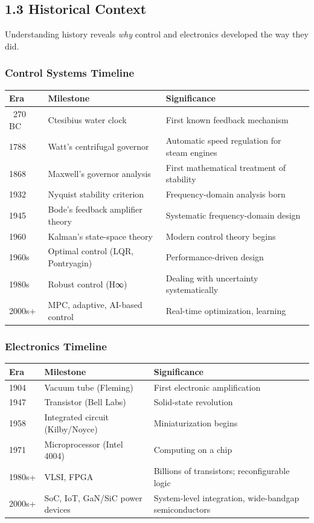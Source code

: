 \documentclass[11pt,a4paper]{book}
\begin{document}
\medskip\noindent\hrulefill\medskip

\subsection{1.3 Historical Context}

Understanding history reveals \textit{why} control and electronics developed the way they did.

\subsubsection{Control Systems Timeline}

\begin{center}
\begin{tabular}{|l|l|l|}
\hline
Era & Milestone & Significance \\
\hline
~270 BC & Ctesibius water clock & First known feedback mechanism \\
1788 & Watt's centrifugal governor & Automatic speed regulation for steam engines \\
1868 & Maxwell's governor analysis & First mathematical treatment of stability \\
1932 & Nyquist stability criterion & Frequency-domain analysis born \\
1945 & Bode's feedback amplifier theory & Systematic frequency-domain design \\
1960 & Kalman's state-space theory & Modern control theory begins \\
1960s & Optimal control (LQR, Pontryagin) & Performance-driven design \\
1980s & Robust control (H∞) & Dealing with uncertainty systematically \\
2000s+ & MPC, adaptive, AI-based control & Real-time optimization, learning \\
\hline
\end{tabular}
\end{center}

\subsubsection{Electronics Timeline}

\begin{center}
\begin{tabular}{|l|l|l|}
\hline
Era & Milestone & Significance \\
\hline
1904 & Vacuum tube (Fleming) & First electronic amplification \\
1947 & Transistor (Bell Labs) & Solid-state revolution \\
1958 & Integrated circuit (Kilby/Noyce) & Miniaturization begins \\
1971 & Microprocessor (Intel 4004) & Computing on a chip \\
1980s+ & VLSI, FPGA & Billions of transistors; reconfigurable logic \\
2000s+ & SoC, IoT, GaN/SiC power devices & System-level integration, wide-bandgap semiconductors \\
\hline
\end{tabular}
\end{center}
\end{document}

